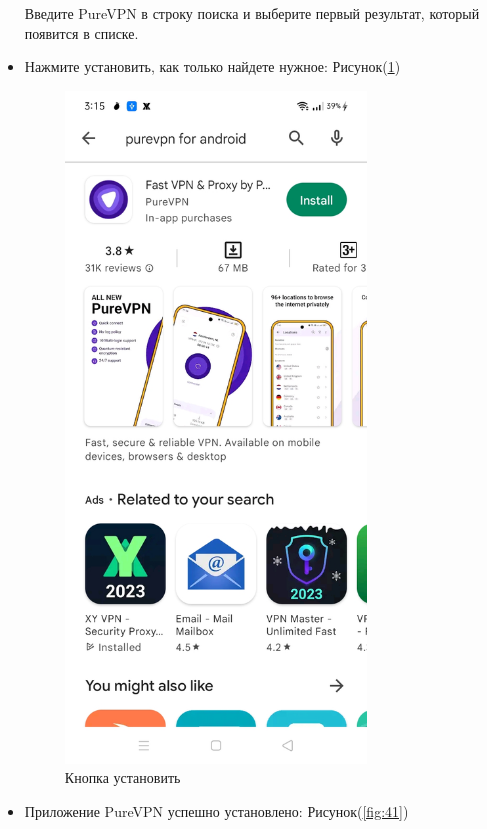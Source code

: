 \begin{itemize}
Введите PureVPN в строку поиска и выберите первый результат, который появится в списке.
\item Нажмите установить, как только найдете нужное:  Рисунок(\ref{fig:40})
\begin{figure}[H]
\includegraphics[width=8cm]{31.png}
\centering
\caption{Кнопка установить}
\label{fig:40}
\end{figure}
\item Приложение PureVPN успешно установлено:  Рисунок(\ref{fig:41})
\begin{figure}[H]

\end{figure}
\end{itemize}
